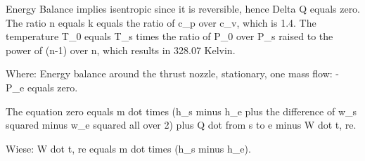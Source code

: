 Energy Balance implies isentropic since it is reversible, hence Delta Q equals zero. The ratio n equals k equals the ratio of c_p over c_v, which is 1.4. The temperature T_0 equals T_s times the ratio of P_0 over P_s raised to the power of (n-1) over n, which results in 328.07 Kelvin.

Where: Energy balance around the thrust nozzle, stationary, one mass flow:
- P_e equals zero.

The equation zero equals m dot times (h_s minus h_e plus the difference of w_s squared minus w_e squared all over 2) plus Q dot from s to e minus W dot t, re.

Wiese: W dot t, re equals m dot times (h_s minus h_e).